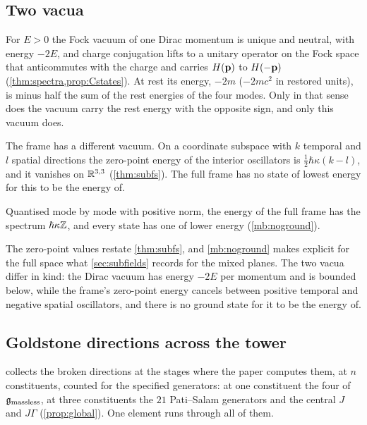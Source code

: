 \subsection{Two vacua}
\label{sec:masstwovacua}

For $E>0$ the Fock vacuum of one Dirac momentum is unique and neutral, with energy $-2E$, and charge conjugation lifts to a unitary operator on
the Fock space that anticommutes with the charge and carries $H(\mathbf p)$ to $H(-\mathbf p)$ (\cref{thm:spectra,prop:Cstates}). At rest its energy,
$-2m$ ($-2mc^2$ in restored units), is minus half the sum of the rest energies of the four modes. Only in that sense does the vacuum
carry the rest energy with the opposite sign, and only this vacuum does.

The frame has a different vacuum. On a coordinate subspace with $k$ temporal and $l$ spatial directions the zero-point energy of the
interior oscillators is $\tfrac12\hbar\kappa(k-l)$, and it vanishes on $\mathbb{R}^{3,3}$ (\cref{thm:subfs}). The full frame has no state of
lowest energy for this to be the energy of.

Quantised mode by mode with positive norm, the energy of the full frame has the spectrum $\hbar\kappa\mathbb{Z}$, and every state has one of lower energy (\cref{mb:noground}).

The zero-point values restate \cref{thm:subfs}, and \cref{mb:noground} makes explicit for the full space what \cref{sec:subfields} records for the mixed planes. The two
vacua differ in kind: the Dirac vacuum has energy $-2E$ per momentum and is bounded below, while the frame's zero-point energy cancels
between positive temporal and negative spatial oscillators, and there is no ground state for it to be the energy of.

\subsection{Goldstone directions across the tower}
\label{sec:massgoldstone}

 collects the broken directions at the stages where the paper computes them, at $n$ constituents, counted for the specified generators:
at one constituent the four of $\mathfrak g_{\rm massless}$, at three constituents the $21$ Pati--Salam generators and the central $J$ and
$J\Gamma$ (\cref{prop:global}). One element runs through all of them.

